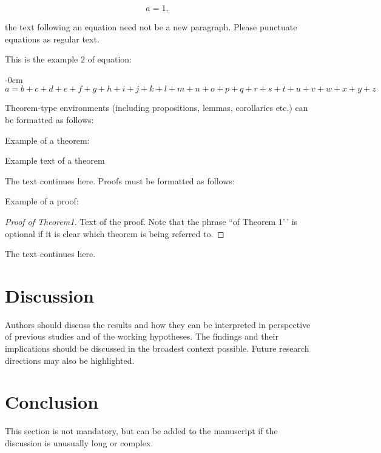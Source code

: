 \documentclass[notspecified,article,submit,moreauthors,pdftex]{Definitions/mdpi}
\begin{document}
\begin{equation}
a = 1,
\end{equation}

the text following an equation need not be a new paragraph. Please
punctuate equations as regular text.

This is the example 2 of equation:

\begin{adjustwidth}{-\extralength}{0cm}
\begin{equation}
a = b + c + d + e + f + g + h + i + j + k + l + m + n + o + p + q + r + s + t + 
u + v + w + x + y + z
\end{equation}
\end{adjustwidth}

Theorem-type environments (including propositions, lemmas, corollaries
etc.) can be formatted as follows:

Example of a theorem:

\begin{Theorem}
Example text of a theorem

\end{Theorem}

The text continues here. Proofs must be formatted as follows:

Example of a proof:

\begin{proof}[Proof of Theorem1]
Text of the proof. Note that the phrase ``of Theorem 1'\,' is optional
if it is clear which theorem is being referred to.

\end{proof}

The text continues here.

\section{Discussion}\label{discussion}

Authors should discuss the results and how they can be interpreted in
perspective of previous studies and of the working hypotheses. The
findings and their implications should be discussed in the broadest
context possible. Future research directions may also be highlighted.

\section{Conclusion}\label{conclusion}

This section is not mandatory, but can be added to the manuscript if the
discussion is unusually long or complex.
\end{document}
